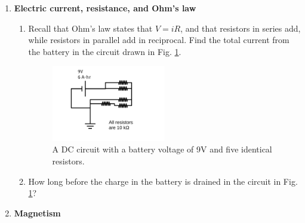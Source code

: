 \documentclass[10pt]{article}
\begin{document}
\begin{enumerate}
\begin{enumerate}
\item The capacitance of a parallel plate capacitor is $C = \epsilon_0 A/d$, where $A$ is the area of the plates, $d$ is the separation between the plates, and $\epsilon_0 = 8.85 \times 10^{-12}$ N$^{-1}$ C$^2$ m$^{-2}$.  What is the capacitance of a capacitor with an area of 2 mm$^2$ and a separation of 0.1 mm? \\ \vspace{2cm}
\end{enumerate}
\item \textbf{Electric current, resistance, and Ohm's law}
\begin{enumerate}
\item Recall that Ohm's law states that $V = iR$, and that resistors in series add, while resistors in parallel add in reciprocal.  Find the total current from the battery in the circuit drawn in Fig. \ref{fig:circuit}.
\begin{figure}[hb]
\centering
\includegraphics[width=0.5\textwidth]{figures/circuitExample2.pdf}
\caption{\label{fig:circuit} A DC circuit with a battery voltage of 9V and five identical resistors.}
\end{figure}
\item How long before the charge in the battery is drained in the circuit in Fig. \ref{fig:circuit}? \\ \vspace{3cm}
\end{enumerate}
\item \textbf{Magnetism}
\begin{enumerate}
\begin{figure}

\end{figure}
\end{enumerate}
\end{enumerate}
\end{document}
